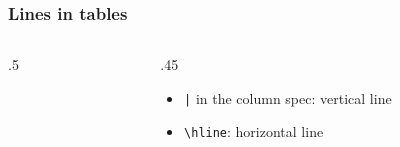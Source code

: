 \begin{frame}
    \frametitle{Lines in tables}
    \begin{columns}[T, onlytextwidth]
        \begin{column}{.5\textwidth}
        \end{column}
        \begin{column}{.45\textwidth}
            \begin{center}
                
            \end{center}
            \begin{itemize}
                \item<2-> \texttt{|} in the column spec: vertical line
                \item<3-> \texttt{\textbackslash hline}: horizontal line
            \end{itemize}
        \end{column}
    \end{columns}
\end{frame}

